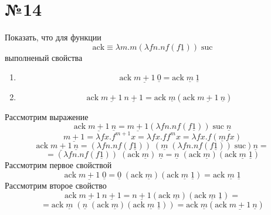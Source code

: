 \documentclass[a4paper,14pt]{scrreprt}
\newcommand{\lmd}{\lambda}
\begin{document}
\section*{№14}
Показать, что для функции 
$$ \text{ack}
 \equiv \lmd m. m(\lmd fn. nf(f\underline{1})) \; \text{suc} $$
выполненый свойства
\begin{enumerate}
\item $$ \text{ack} \; \underline{m + 1}\: \underline{0} = \text{ack} \; \underline{m}\: \underline{1} $$
\item $$ \text{ack} \; \underline{m + 1}\: \underline{n + 1} = \text{ack} \; \underline{m} (\text{ack} \;  \underline{m + 1} \: \underline{n}) $$
\end{enumerate}
Рассмотрим выражение 
$$ \text{ack} \; \underline{m + 1}\: \underline{n} = \underline{m + 1} (\lmd fn. nf(f\underline{1})) \; \text{suc} \; \underline{n} $$ 
$$ \underline{m + 1} = \lmd fx.f^{m + 1}x = \lmd fx. ff^{m}x = \lmd fx.f(\underline{m} fx) $$
$$ \text{ack} \; \underline{m + 1}\: \underline{n} = (\lmd fn. nf(f\underline{1}))\; (\underline{m} \; (\lmd fn. nf(f\underline{1})) \; \text{suc}) \underline{n} = $$
$$ = (\lmd fn. nf(f\underline{1}))\; (\text{ack} \; \underline{m}) \; \underline{n} = 
\underline{n} \; (\text{ack} \; \underline{m}) (\text{ack} \; \underline{m} \; \underline{1}) $$
Рассмотрим первое свойствой
$$ \text{ack} \; \underline{m+1} \; \underline{0} = \underline{0} \; (\text{ack} \; \underline{m}) (\text{ack} \; \underline{m} \; \underline{1}) = 
 \text{ack} \; \underline{m} \; \underline{1} $$
Рассмотрим второе свойство
$$ \text{ack} \; \underline{m + 1}\: \underline{n + 1}  
= \underline{n+1} (\text{ack} \; \underline{m}) (\text{ack} \; \underline{m} \; \underline{1}) = $$
$$ = \text{ack} \; \underline{m} \; (\underline{n} \; (\text{ack} \; \underline{m}) (\text{ack} \; \underline{m} \; \underline{1}))
=  \text{ack} \; \underline{m} (\text{ack} \;  \underline{m + 1} \: \underline{n}) $$ 
\end{document}
